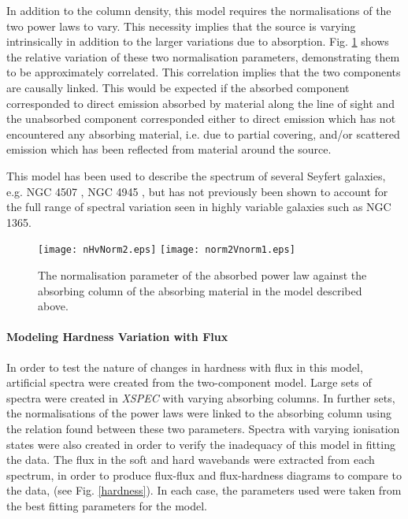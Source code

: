 \documentclass[letters,useAMS,usenatbib]{samnote}
\begin{document}
In addition to the column density, this model requires the normalisations of the two power laws to vary. This necessity implies that the source is varying intrinsically
in addition to the larger variations due to absorption. Fig. \ref{normplots} shows the relative variation of these two normalisation parameters, demonstrating them to be
approximately correlated. This correlation implies that the two components are causally linked. This would be expected if the absorbed component corresponded to direct
emission absorbed by material along the line of sight and the unabsorbed component corresponded either to direct emission which has not encountered any absorbing
material, i.e. due to partial covering, and/or scattered emission which has been reflected from material around the source. 

This model has been used to describe the spectrum of several Seyfert galaxies, e.g. NGC 4507 \citep{braito}, NGC 4945 \citep{done}, but has not previously been shown to
account for the full range of spectral variation seen in highly variable galaxies such as NGC 1365.

\begin{figure}
	
	\texttt{[image: nHvNorm2.eps]}\hspace{1pt}
	\texttt{[image: norm2Vnorm1.eps]}\hspace{1pt}
	\caption{The normalisation parameter of the absorbed power law 
		against the absorbing column of the absorbing material in
		the model described above.}
	
	\label{normplots}
\end{figure}  

\paragraph{Modeling Hardness Variation with Flux}

  				
In order to test the nature of changes in hardness with flux in this model, artificial spectra were created from the two-component model. Large sets of spectra were
created in {\it XSPEC} with varying absorbing columns. In further sets, the normalisations of the power laws were linked to the absorbing column using the relation
found between these two parameters. Spectra with varying ionisation states were also created in order to verify the inadequacy of this model in fitting the data. The flux
in the soft and hard wavebands were extracted from each spectrum, in order to produce flux-flux and flux-hardness diagrams to compare to the data, (see Fig.
\ref{hardness}). In each case, the parameters used were taken from the best fitting parameters for the model.
\end{document}
